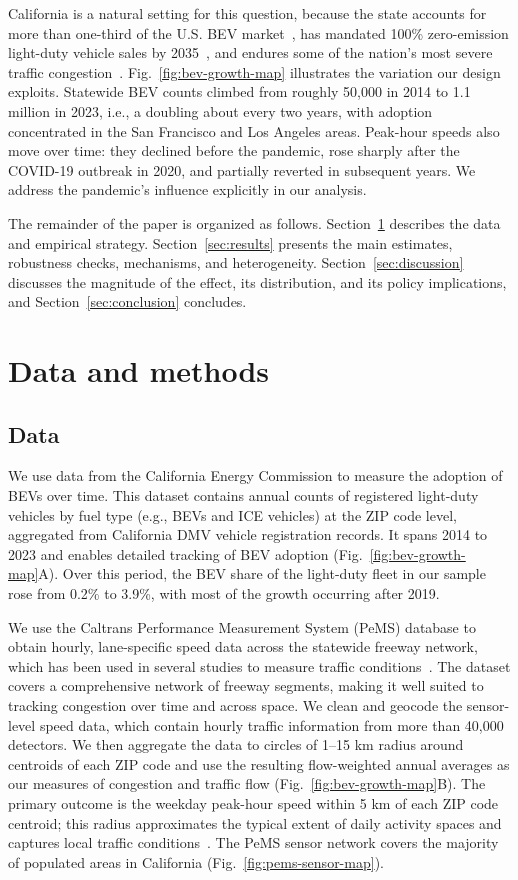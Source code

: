 \documentclass[11pt, letterpaper]{article}
\begin{document}
California is a natural setting for this question, because the state accounts for more than one-third of the U.S. BEV market~\citep{DOE_TA}, has mandated 100\% zero-emission light-duty vehicle sales by 2035~\citep{CARB2022}, and endures some of the nation's most severe traffic congestion~\citep{DOT_Congestion}.
Fig.~\ref{fig:bev-growth-map} illustrates the variation our design exploits.
Statewide BEV counts climbed from roughly 50,000 in 2014 to 1.1 million in 2023, i.e., a doubling about every two years, with adoption concentrated in the San Francisco and Los Angeles areas.
Peak-hour speeds also move over time: they declined before the pandemic, rose sharply after the COVID-19 outbreak in 2020, and partially reverted in subsequent years.
We address the pandemic's influence explicitly in our analysis.

The remainder of the paper is organized as follows.
Section~\ref{sec:methods} describes the data and empirical strategy.
Section~\ref{sec:results} presents the main estimates, robustness checks, mechanisms, and heterogeneity.
Section~\ref{sec:discussion} discusses the magnitude of the effect, its distribution, and its policy implications, and Section~\ref{sec:conclusion} concludes.


\section{Data and methods}\label{sec:methods}
\subsection{Data}
We use data from the California Energy Commission to measure the adoption of BEVs over time.
This dataset contains annual counts of registered light-duty vehicles by fuel type (e.g., BEVs and ICE vehicles) at the ZIP code level, aggregated from California DMV vehicle registration records.
It spans 2014 to 2023 and enables detailed tracking of BEV adoption (Fig.~\ref{fig:bev-growth-map}A).
Over this period, the BEV share of the light-duty fleet in our sample rose from 0.2\% to 3.9\%, with most of the growth occurring after 2019.

We use the Caltrans Performance Measurement System (PeMS) database to obtain hourly, lane-specific speed data across the statewide freeway network, which has been used in several studies to measure traffic conditions~\citep{Kim2022, Bento2014}.
The dataset covers a comprehensive network of freeway segments, making it well suited to tracking congestion over time and across space.
We clean and geocode the sensor-level speed data, which contain hourly traffic information from more than 40,000 detectors.
We then aggregate the data to circles of 1--15 km radius around centroids of each ZIP code and use the resulting flow-weighted annual averages as our measures of congestion and traffic flow (Fig.~\ref{fig:bev-growth-map}B).
The primary outcome is the weekday peak-hour speed within 5 km of each ZIP code centroid; this radius approximates the typical extent of daily activity spaces and captures local traffic conditions~\citep{Colak2016, Xu2016, Saiz2013}.
The PeMS sensor network covers the majority of populated areas in California (Fig.~\ref{fig:pems-sensor-map}).
\end{document}
